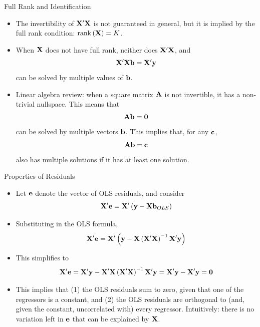 \documentclass[aspectratio=169,11pt]{beamer}
\begin{document}
\begin{frame}{Full Rank and Identification}
\begin{itemize}
	\item The invertibility of ${\bf X}'{\bf X}$ is not guaranteed in general, but
	it is implied by the full rank condition: $\operatorname{rank}\left({\bf X}\right) = K$.

	\item When ${\bf X}$ does not have full rank, neither does ${\bf X}'{\bf X}$, and \[
	{\bf X}'{\bf X} {\bf b} =  {\bf X}' {\bf y} 
	\]
	can be solved by multiple values of ${\bf b}$. 

	\item Linear algebra review: when a square matrix ${\bf A}$ is not invertible, 
	it has a non-trivial nullspace. This means that \[
	{\bf A} {\bf b} =  {\bf 0}
	\]
	can be solved by multiple vectors ${\bf b}$. This implies that, for any ${\bf c} $,
	\[
	{\bf A} {\bf b} =  {\bf c} 
	\]
	also has multiple solutions if it has at least one solution. 
	

\end{itemize}
\end{frame}


\begin{frame}{Properties of Residuals}
\begin{itemize}
	\item Let ${\bf e} $ denote the vector of OLS residuals, and consider \[
		{\bf X}' {\bf e} = {\bf X}' \left({\bf y} - {\bf X} {\bf b}_{OLS} \right) 
	\]
	\item Substituting in the OLS formula, 
 \[
		{\bf X}' {\bf e} = {\bf X}' \left({\bf y} - {\bf X} \left({\bf X}'{\bf X}\right)^{-1} {\bf X}' {\bf y} \right) 
	\]

\item This simplifies to 
 \[
		{\bf X}' {\bf e} = {\bf X}' {\bf y} -  {\bf X}'{\bf X}\left({\bf X}'{\bf X}\right)^{-1}{\bf X}' {\bf y}  = {\bf X}' {\bf y} -  {\bf X}' {\bf y}  = {\bf 0}
	\]

	\item This implies that (1) the OLS residuals sum to zero, given that one of the regressors is a constant, and
	(2) the OLS residuals are orthogonal to (and, given the constant, uncorrelated with) every regressor. Intuitively: there is no variation left in ${\bf e} $
	 that can be explained by ${\bf X}$.
	
\end{itemize}
\end{frame}
\end{document}
